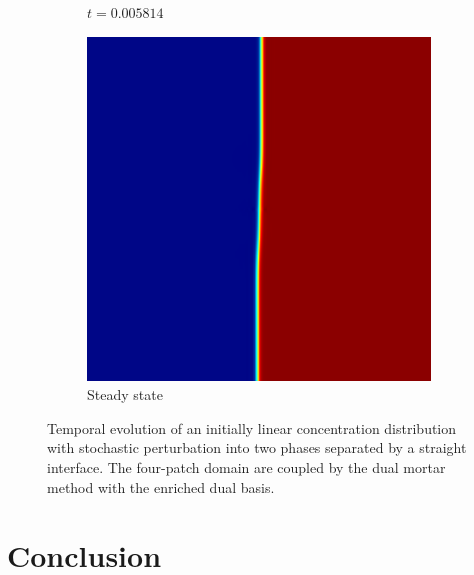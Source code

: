 \begin{figure}[ht]
\begin{subfigure}[t]{.3\linewidth}
		\vspace{-.4\baselineskip}
		\caption{{$t=0.005814$}}
	\end{subfigure}
	\begin{subfigure}[t]{.3\linewidth}
		\center
		\includegraphics[scale=.25]{linear_ch_8}
		\vspace{-.4\baselineskip}
		\caption{Steady state}
	\end{subfigure}
	\caption{Temporal evolution of an initially linear concentration distribution with stochastic perturbation into two phases separated by a straight interface. The four-patch domain are coupled by the dual mortar method with the enriched dual basis.}\label{fig:phase_field_linear}
\end{figure}
\FloatBarrier

\section{Conclusion}\label{sec:conlusion}

